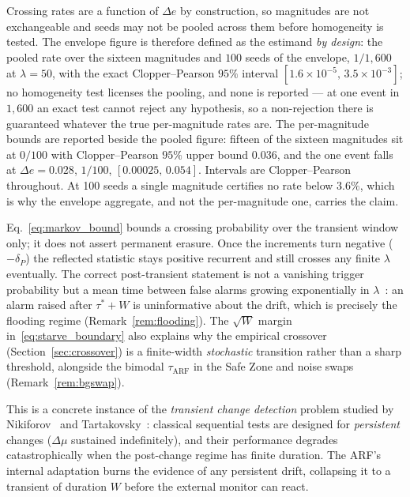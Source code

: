 \documentclass[smallextended]{svjour3}
\newcommand{\SixSeeds}{100}                  %
\begin{document}
\begin{remark}\label{rem:aggregation}
  Crossing rates are a function of $\Delta e$ by construction, so magnitudes are not exchangeable and seeds may not be pooled across them before homogeneity is tested. The envelope figure is therefore defined as the estimand \emph{by design}: the pooled rate over the sixteen magnitudes and $100$ seeds of the envelope, $1/1{,}600$ at $\lambda = 50$, with the exact Clopper--Pearson $95\%$ interval $[1.6\times10^{-5},\, 3.5\times10^{-3}]$; no homogeneity test licenses the pooling, and none is reported --- at one event in $1{,}600$ an exact test cannot reject any hypothesis, so a non-rejection there is guaranteed whatever the true per-magnitude rates are. The per-magnitude bounds are reported beside the pooled figure: fifteen of the sixteen magnitudes sit at $0/100$ with Clopper--Pearson $95\%$ upper bound $0.036$, and the one event falls at $\Delta e = 0.028$, $1/100$, $[0.00025,\, 0.054]$. Intervals are Clopper--Pearson throughout. At \SixSeeds{} seeds a single magnitude certifies no rate below $3.6\%$, which is why the envelope aggregate, and not the per-magnitude one, carries the claim.
\end{remark}

\begin{remark}\label{rem:sufficient}
  Eq.~\eqref{eq:markov_bound} bounds a crossing probability over the transient window only; it does not assert permanent erasure. Once the increments turn negative ($-\delta_P$) the reflected statistic stays positive recurrent and still crosses any finite $\lambda$ eventually. The correct post-transient statement is not a vanishing trigger probability but a mean time between false alarms growing exponentially in $\lambda$~\cite{tartakovsky_2014,page_1954}: an alarm raised after $\tau^* + W$ is uninformative about the drift, which is precisely the flooding regime (Remark~\ref{rem:flooding}). The $\sqrt{W}$ margin in~\eqref{eq:starve_boundary} also explains why the empirical crossover (Section~\ref{sec:crossover}) is a finite-width \emph{stochastic} transition rather than a sharp threshold, alongside the bimodal $\tau_{\mathrm{ARF}}$ in the Safe Zone and noise swaps (Remark~\ref{rem:bgswap}).
\end{remark}

This is a concrete instance of the \emph{transient change detection} problem studied by Nikiforov~\cite{nikiforov_2012} and Tartakovsky~\cite{tartakovsky_2023_transient}: classical sequential tests are designed for \emph{persistent} changes ($\Delta\mu$ sustained indefinitely), and their performance degrades catastrophically when the post-change regime has finite duration.
The ARF's internal adaptation burns the evidence of any persistent drift, collapsing it to a transient of duration $W$ before the external monitor can react.
\end{document}

